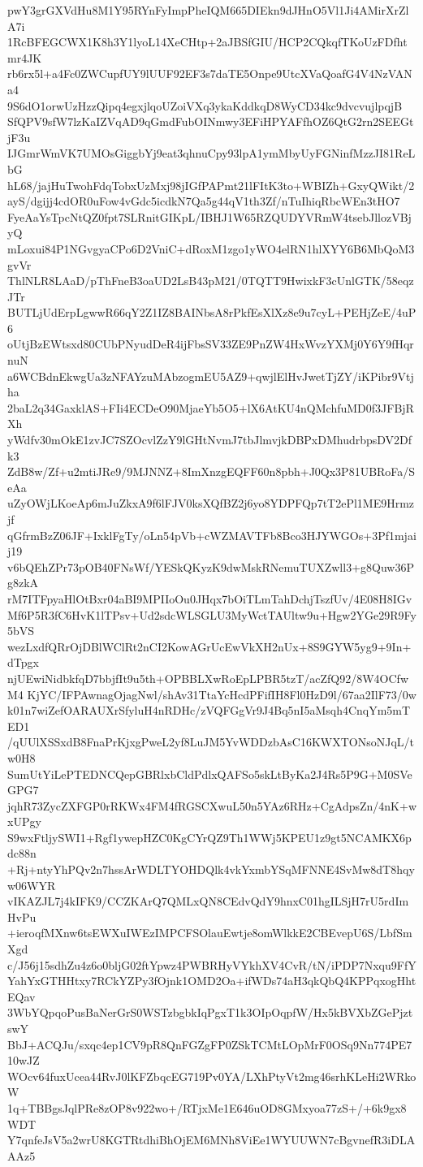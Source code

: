 pwY3grGXVdHu8M1Y95RYnFyImpPheIQM665DIEkn9dJHnO5Vl1Ji4AMirXrZlA7i
1RcBFEGCWX1K8h3Y1lyoL14XeCHtp+2aJBSfGIU/HCP2CQkqfTKoUzFDfhtmr4JK
rb6rx5l+a4Fc0ZWCupfUY9lUUF92EF3s7daTE5Onpe9UtcXVaQoafG4V4NzVANa4
9S6dO1orwUzHzzQipq4egxjlqoUZoiVXq3ykaKddkqD8WyCD34kc9dvcvujlpqjB
SfQPV9sfW7lzKaIZVqAD9qGmdFubOINmwy3EFiHPYAFfhOZ6QtG2rn2SEEGtjF3u
IJGmrWmVK7UMOsGiggbYj9eat3qhnuCpy93lpA1ymMbyUyFGNinfMzzJI81ReLbG
hL68/jajHuTwohFdqTobxUzMxj98jIGfPAPmt21lFItK3to+WBIZh+GxyQWikt/2
ayS/dgijj4cdOR0uFow4vGdc5icdkN7Qa5g44qV1th3Zf/nTuIhiqRbcWEn3tHO7
FyeAaYsTpcNtQZ0fpt7SLRnitGIKpL/IBHJ1W65RZQUDYVRmW4tsebJllozVBjyQ
mLoxui84P1NGvgyaCPo6D2VniC+dRoxM1zgo1yWO4elRN1hlXYY6B6MbQoM3gvVr
ThlNLR8LAaD/pThFneB3oaUD2LsB43pM21/0TQTT9HwixkF3cUnlGTK/58eqzJTr
BUTLjUdErpLgwwR66qY2Z1IZ8BAINbsA8rPkfEsXlXz8e9u7cyL+PEHjZeE/4uP6
oUtjBzEWtsxd80CUbPNyudDeR4ijFbsSV33ZE9PnZW4HxWvzYXMj0Y6Y9fHqrnuN
a6WCBdnEkwgUa3zNFAYzuMAbzogmEU5AZ9+qwjlElHvJwetTjZY/iKPibr9Vtjha
2baL2q34GaxklAS+FIi4ECDeO90MjaeYb5O5+lX6AtKU4nQMchfuMD0f3JFBjRXh
yWdfv30mOkE1zvJC7SZOcvlZzY9lGHtNvmJ7tbJlmvjkDBPxDMhudrbpsDV2Dfk3
ZdB8w/Zf+u2mtiJRe9/9MJNNZ+8ImXnzgEQFF60n8pbh+J0Qx3P81UBRoFa/SeAa
uZyOWjLKoeAp6mJuZkxA9f6lFJV0ksXQfBZ2j6yo8YDPFQp7tT2ePl1ME9Hrmzjf
qGfrmBzZ06JF+IxklFgTy/oLn54pVb+cWZMAVTFb8Bco3HJYWGOs+3Pf1mjaij19
v6bQEhZPr73pOB40FNsWf/YESkQKyzK9dwMskRNemuTUXZwll3+g8Quw36Pg8zkA
rM7ITFpyaHlOtBxr04aBI9MPIIoOu0JHqx7bOiTLmTahDchjTszfUv/4E08H8IGv
Mf6P5R3fC6HvK1lTPsv+Ud2sdcWLSGLU3MyWctTAUltw9u+Hgw2YGe29R9Fy5bVS
wezLxdfQRrOjDBlWClRt2nCI2KowAGrUcEwVkXH2nUx+8S9GYW5yg9+9In+dTpgx
njUEwiNidbkfqD7bbjfIt9u5th+OPBBLXwRoEpLPBR5tzT/acZfQ92/8W4OCfwM4
KjYC/IFPAwnagOjagNwl/shAv31TtaYcHcdPFifIH8Fl0HzD9l/67aa2IlF73/0w
k01n7wiZefOARAUXrSfyluH4nRDHc/zVQFGgVr9J4Bq5nI5aMsqh4CnqYm5mTED1
/qUUlXSSxdB8FnaPrKjxgPweL2yf8LuJM5YvWDDzbAsC16KWXTONsoNJqL/tw0H8
SumUtYiLePTEDNCQepGBRlxbCldPdlxQAFSo5skLtByKa2J4Rs5P9G+M0SVeGPG7
jqhR73ZycZXFGP0rRKWx4FM4fRGSCXwuL50n5YAz6RHz+CgAdpsZn/4nK+wxUPgy
S9wxFtljySWI1+Rgf1ywepHZC0KgCYrQZ9Th1WWj5KPEU1z9gt5NCAMKX6pdc88n
+Rj+ntyYhPQv2n7hssArWDLTYOHDQlk4vkYxmbYSqMFNNE4SvMw8dT8hqyw06WYR
vIKAZJL7j4kIFK9/CCZKArQ7QMLxQN8CEdvQdY9hnxC01hgILSjH7rU5rdImHvPu
+ieroqfMXnw6tsEWXuIWEzIMPCFSOlauEwtje8omWlkkE2CBEvepU6S/LbfSmXgd
c/J56j15sdhZu4z6o0bljG02ftYpwz4PWBRHyVYkhXV4CvR/tN/iPDP7Nxqu9FfY
YahYxGTHHtxy7RCkYZPy3fOjnk1OMD2Oa+ifWDs74aH3qkQbQ4KPPqxogHhtEQav
3WbYQpqoPusBaNerGrS0WSTzbgbkIqPgxT1k3OIpOqpfW/Hx5kBVXbZGePjztswY
BbJ+ACQJu/sxqc4ep1CV9pR8QnFGZgFP0ZSkTCMtLOpMrF0OSq9Nn774PE710wJZ
WOcv64fuxUcea44RvJ0lKFZbqcEG719Pv0YA/LXhPtyVt2mg46srhKLeHi2WRkoW
1q+TBBgsJqlPRe8zOP8v922wo+/RTjxMe1E646uOD8GMxyoa77zS+/+6k9gx8WDT
Y7qnfeJsV5a2wrU8KGTRtdhiBhOjEM6MNh8ViEe1WYUUWN7cBgvnefR3iDLAAAz5
